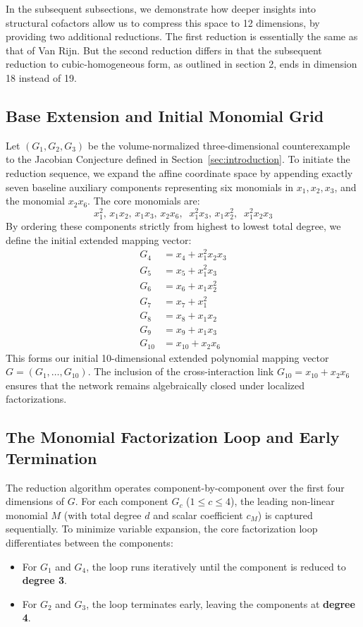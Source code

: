 \documentclass[11pt,a4paper]{article}
\begin{document}
In the subsequent subsections, we demonstrate how deeper insights into structural cofactors allow us to compress this space to 12 dimensions, by providing two additional reductions. The first reduction is essentially the same as that of Van Rijn. But the second reduction differs in that the subsequent reduction to cubic-homogeneous form, as outlined in section 2, ends in dimension 18 instead of 19. 

\subsection{Base Extension and Initial Monomial Grid}

Let $(G_1, G_2, G_3)$ be the volume-normalized three-dimensional counterexample to the Jacobian Conjecture defined in Section~\ref{sec:introduction}. To initiate the reduction sequence, we expand the affine coordinate space by appending exactly seven baseline auxiliary components representing six monomials in $x_1, x_2, x_3$, and the monomial $x_2 x_6$. The core monomials are:
\begin{equation}
x_1^2, \, x_1 x_2, \, x_1 x_3, \, x_2 x_6, \;\; x_1^2 x_3, \, x_1 x_2^2, \;\; x_1^2 x_2 x_3
\end{equation}
By ordering these components strictly from highest to lowest total degree, we define the initial extended mapping vector:
\begin{align}
G_4  &= x_4  + x_1^2 x_2 x_3 \\
G_5  &= x_5  + x_1^2 x_3 \\
G_6  &= x_6  + x_1 x_2^2 \\
G_7  &= x_7  + x_1^2 \\
G_8  &= x_8  + x_1 x_2 \\
G_9  &= x_9  + x_1 x_3 \\
G_{10} &= x_{10} + x_2 x_6
\end{align}
This forms our initial 10-dimensional extended polynomial mapping vector $G = (G_1, \dots, G_{10})$. The inclusion of the cross-interaction link $G_{10} = x_{10} + x_2 x_6$ ensures that the network remains algebraically closed under localized factorizations.

\subsection{The Monomial Factorization Loop and Early Termination}

The reduction algorithm operates component-by-component over the first four dimensions of $G$. For each component $G_c$ ($1 \le c \le 4$), the leading non-linear monomial $M$ (with total degree $d$ and scalar coefficient $c_M$) is captured sequentially. To minimize variable expansion, the core factorization loop differentiates between the components:
\begin{itemize}
    \item For $G_1$ and $G_4$, the loop runs iteratively until the component is reduced to \textbf{degree 3}.
    \item For $G_2$ and $G_3$, the loop terminates early, leaving the components at \textbf{degree 4}.
\end{itemize}
\end{document}
